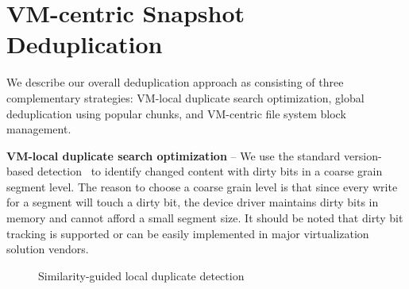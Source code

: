 \section{VM-centric Snapshot Deduplication}
\label{sect:deduplication}


We describe our overall deduplication approach as consisting of three
complementary strategies: VM-local
duplicate search optimization, global deduplication using popular chunks, and 
VM-centric file system block management. 

\textbf{VM-local duplicate search optimization} --
We use the standard version-based detection~\cite{Clements2009,Vrable2009}
to identify changed content with dirty bits in a coarse grain segment level.
The reason to choose a coarse grain level is that 
since every write for a segment will touch a dirty bit, the device driver maintains dirty bits in 
memory and cannot afford a small segment size.
It should be noted that dirty bit tracking is supported or can be easily implemented in 
major virtualization solution vendors. 

\begin{figure}[htbp]
  \centering
  \caption{Similarity-guided local duplicate detection}
  \label{fig:local_dedup}
\end{figure}

